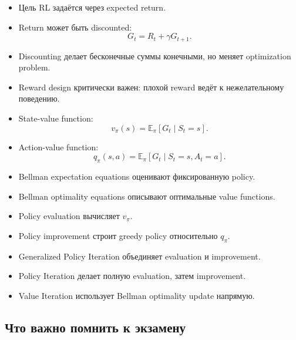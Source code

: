 \documentclass[a4paper,12pt]{article}
\begin{document}
\begin{itemize}
    \item Цель RL задаётся через expected return.
    \item Return может быть discounted:
    \[
    G_t = R_t + \gamma G_{t+1}.
    \]

    \item Discounting делает бесконечные суммы конечными, но меняет optimization problem.
    \item Reward design критически важен: плохой reward ведёт к нежелательному поведению.
    \item State-value function:
    \[
    v_\pi(s)=\mathbb{E}_\pi[G_t\mid S_t=s].
    \]

    \item Action-value function:
    \[
    q_\pi(s,a)=\mathbb{E}_\pi[G_t\mid S_t=s,A_t=a].
    \]

    \item Bellman expectation equations оценивают фиксированную policy.
    \item Bellman optimality equations описывают оптимальные value functions.
    \item Policy evaluation вычисляет \(v_\pi\).
    \item Policy improvement строит greedy policy относительно \(q_\pi\).
    \item Generalized Policy Iteration объединяет evaluation и improvement.
    \item Policy Iteration делает полную evaluation, затем improvement.
    \item Value Iteration использует Bellman optimality update напрямую.
\end{itemize}

\subsection{Что важно помнить к экзамену}
\end{document}
